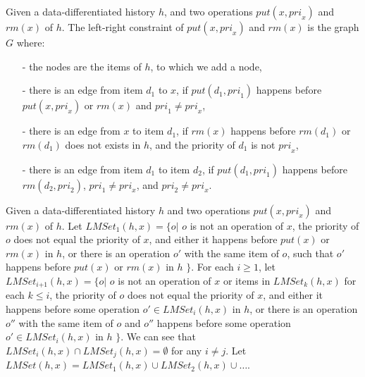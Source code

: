 \begin{definition}\label{def:left-right constraint for matched put and rm operations}
Given a data-differentiated history $h$, and two operations $\textit{put}(x,\textit{pri}_x)$ and $\textit{rm}(x)$ of $h$. The left-right constraint of $\textit{put}(x,\textit{pri}_x)$ and $\textit{rm}(x)$ is the graph $G$ where:

\begin{itemize}
\setlength{\itemsep}{0.5pt}
\item[-] the nodes are the items of $h$, to which we add a node,

\item[-] there is an edge from item $d_1$ to $x$, if $\textit{put}(d_1,\textit{pri}_1)$ happens before $\textit{put}(x,\textit{pri}_x)$ or $\textit{rm}(x)$ and $\textit{pri}_1 \neq \textit{pri}_x$,

\item[-] there is an edge from $x$ to item $d_1$, if $\textit{rm}(x)$ happens before $\textit{rm}(d_1)$ or $\textit{rm}(d_1)$ does not exists in $h$, and the priority of $d_1$ is not $\textit{pri}_x$,

\item[-] there is an edge from item $d_1$ to item $d_2$, if $\textit{put}(d_1,\textit{pri}_1)$ happens before $\textit{rm}(d_2,\textit{pri}_2)$, $\textit{pri}_1 \neq \textit{pri}_x$, and $\textit{pri}_2 \neq \textit{pri}_x$.
\end{itemize}
\end{definition}

Given a data-differentiated history $h$ and two operations $\textit{put}(x,\textit{pri}_x)$ and $\textit{rm}(x)$ of $h$. Let $\textit{LMSet}_1(h,x) = \{ o \vert$ $o$ is not an operation of $x$, the priority of $o$ does not equal the priority of $x$, and either it happens before $\textit{put}(x)$ or $\textit{rm}(x)$ in $h$, or there is an operation $o'$ with the same item of $o$, such that $o'$ happens before $\textit{put}(x)$ or $\textit{rm}(x)$ in $h$ $\}$. For each $i \geq 1$, let $\textit{LMSet}_{\textit{i+1}}(h,x) = \{ o \vert$ $o$ is not an operation of $x$ or items in $\textit{LMSet}_k(h,x)$ for each $k \leq i$, the priority of $o$ does not equal the priority of $x$, and either it happens before some operation $o' \in \textit{LMSet}_i(h,x)$ in $h$, or there is an operation $o''$ with the same item of $o$ and $o''$ happens before some operation $o' \in \textit{LMSet}_i(h,x)$ in $h$ $\}$. %
We can see that $\textit{LMSet}_i(h,x) \cap \textit{LMSet}_j(h,x) = \emptyset$ for any $i \neq j$. Let $\textit{LMSet}(h,x) = \textit{LMSet}_1(h,x) \cup \textit{LMSet}_2(h,x) \cup \ldots$. %

